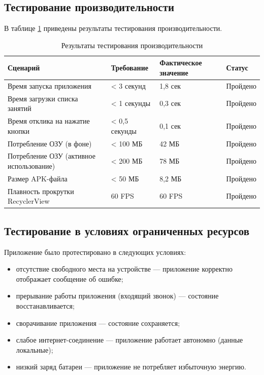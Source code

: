 \subsection{Тестирование производительности}

В таблице \ref{tab:performance} приведены результаты тестирования производительности.

\renewcommand{\arraystretch}{1.3}
\begin{table}[H]
	\centering
	\caption{Результаты тестирования производительности}
	\label{tab:performance}
	\normalsize
	\setlength{\tabcolsep}{6pt}
	\begin{tabular}{|p{5cm}|p{3cm}|p{3cm}|p{2.5cm}|}
		\hline
		\textbf{Сценарий} & \textbf{Требование} & \textbf{Фактическое значение} & \textbf{Статус} \\
		\hline
		Время запуска приложения & < 3 секунд & 1,8 сек & Пройдено \\
		\hline
		Время загрузки списка занятий & < 1 секунды & 0,3 сек & Пройдено \\
		\hline
		Время отклика на нажатие кнопки & < 0,5 секунды & 0,1 сек & Пройдено \\
		\hline
		Потребление ОЗУ (в фоне) & < 100 МБ & 42 МБ & Пройдено \\
		\hline
		Потребление ОЗУ (активное использование) & < 200 МБ & 78 МБ & Пройдено \\
		\hline
		Размер APK-файла & < 50 МБ & 8,2 МБ & Пройдено \\
		\hline
		Плавность прокрутки RecyclerView & 60 FPS & 60 FPS & Пройдено \\
		\hline
	\end{tabular}
\end{table}
\renewcommand{\arraystretch}{1}

\subsection{Тестирование в условиях ограниченных ресурсов}

Приложение было протестировано в следующих условиях:
\begin{itemize}
	\item отсутствие свободного места на устройстве — приложение корректно отображает сообщение об ошибке;
	\item прерывание работы приложения (входящий звонок) — состояние восстанавливается;
	\item сворачивание приложения — состояние сохраняется;
	\item слабое интернет-соединение — приложение работает автономно (данные локальные);
	\item низкий заряд батареи — приложение не потребляет избыточную энергию.
\end{itemize}

